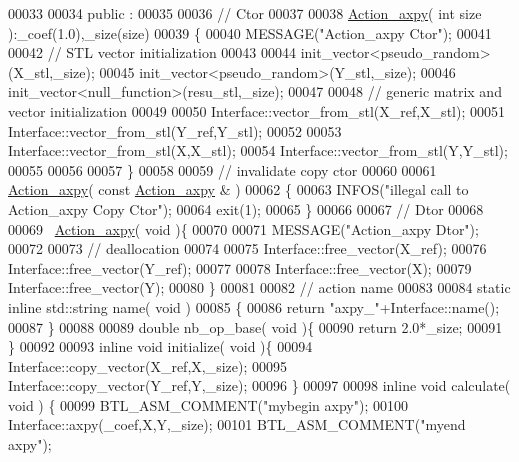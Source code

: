 \begin{DoxyCode}
00033 
00034 public :
00035 
00036   \textcolor{comment}{// Ctor}
00037 
00038   \hyperlink{class_action__axpy}{Action\_axpy}( \textcolor{keywordtype}{int} size ):\_coef(1.0),\_size(size)
00039   \{
00040     MESSAGE(\textcolor{stringliteral}{"Action\_axpy Ctor"});
00041 
00042     \textcolor{comment}{// STL vector initialization}
00043 
00044     init\_vector<pseudo\_random>(X\_stl,\_size);
00045     init\_vector<pseudo\_random>(Y\_stl,\_size);
00046     init\_vector<null\_function>(resu\_stl,\_size);
00047 
00048     \textcolor{comment}{// generic matrix and vector initialization}
00049 
00050     Interface::vector\_from\_stl(X\_ref,X\_stl);
00051     Interface::vector\_from\_stl(Y\_ref,Y\_stl);
00052 
00053     Interface::vector\_from\_stl(X,X\_stl);
00054     Interface::vector\_from\_stl(Y,Y\_stl);
00055 
00056 
00057   \}
00058 
00059   \textcolor{comment}{// invalidate copy ctor}
00060 
00061   \hyperlink{class_action__axpy}{Action\_axpy}( \textcolor{keyword}{const}  \hyperlink{class_action__axpy}{Action\_axpy} & )
00062   \{
00063     INFOS(\textcolor{stringliteral}{"illegal call to Action\_axpy Copy Ctor"});
00064     exit(1);
00065   \}
00066 
00067   \textcolor{comment}{// Dtor}
00068 
00069   ~\hyperlink{class_action__axpy}{Action\_axpy}( \textcolor{keywordtype}{void} )\{
00070 
00071     MESSAGE(\textcolor{stringliteral}{"Action\_axpy Dtor"});
00072 
00073     \textcolor{comment}{// deallocation}
00074 
00075     Interface::free\_vector(X\_ref);
00076     Interface::free\_vector(Y\_ref);
00077 
00078     Interface::free\_vector(X);
00079     Interface::free\_vector(Y);
00080   \}
00081 
00082   \textcolor{comment}{// action name}
00083 
00084   \textcolor{keyword}{static} \textcolor{keyword}{inline} std::string name( \textcolor{keywordtype}{void} )
00085   \{
00086     \textcolor{keywordflow}{return} \textcolor{stringliteral}{"axpy\_"}+Interface::name();
00087   \}
00088 
00089   \textcolor{keywordtype}{double} nb\_op\_base( \textcolor{keywordtype}{void} )\{
00090     \textcolor{keywordflow}{return} 2.0*\_size;
00091   \}
00092 
00093   \textcolor{keyword}{inline} \textcolor{keywordtype}{void} initialize( \textcolor{keywordtype}{void} )\{
00094     Interface::copy\_vector(X\_ref,X,\_size);
00095     Interface::copy\_vector(Y\_ref,Y,\_size);
00096   \}
00097 
00098   \textcolor{keyword}{inline} \textcolor{keywordtype}{void} calculate( \textcolor{keywordtype}{void} ) \{
00099     BTL\_ASM\_COMMENT(\textcolor{stringliteral}{"mybegin axpy"});
00100     Interface::axpy(\_coef,X,Y,\_size);
00101     BTL\_ASM\_COMMENT(\textcolor{stringliteral}{"myend axpy"});

\end{DoxyCode}
